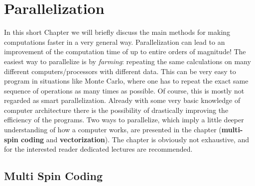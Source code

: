 

\chapter{Parallelization}
\label{chap:parallelization}

In this short Chapter we will briefly discuss the main methods for making computations faster in a very general way. Parallelization can lead to an improvement of the computation time of up to entire orders of magnitude! The easiest way to parallelize is by \emph{farming}: repeating the same calculations on many different computers/processors with different data. This can be very easy to program in situations like Monte Carlo, where one has to repeat the exact same sequence of operations as many times as possible. Of course, this is mostly not regarded as smart parallelization.  Already with some very basic knowledge of computer architecture there is the possibility of drastically improving the efficiency of the programs.  Two ways to parallelize, which imply a little deeper understanding of how a computer works, are presented in the chapter (\textbf{multi-spin coding} and \textbf{vectorization}). The chapter is obviously not exhaustive, and for the interested reader dedicated lectures are recommended.


\section{Multi Spin Coding}
\label{sec:multi_spin}

